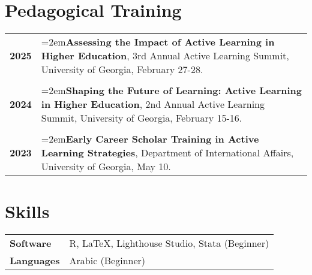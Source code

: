 \documentclass[letterpaper,12pt]{article}
\begin{document}
\section{Pedagogical Training}
\begin{xltabular}{\dimexpr\textwidth-0in}{p{.85in}X}
\textbf{2025} &  \hangindent=2em\textbf{Assessing the Impact of Active Learning in Higher Education}, 3rd Annual Active Learning Summit, University of Georgia, February 27-28.\\ \\
\textbf{2024} &  \hangindent=2em\textbf{Shaping the Future of Learning: Active Learning in Higher Education}, 2nd Annual Active Learning Summit, University of Georgia, February 15-16.\\ \\
\textbf{2023} &  \hangindent=2em\textbf{Early Career Scholar Training in Active Learning Strategies}, Department of \mbox{International} Affairs, University of Georgia, May 10.
\end{xltabular}

\section{Skills}
\begin{xltabular}{\dimexpr\textwidth-0in}{p{.85in}X}
\textbf{Software} &  R, \LaTeX, Lighthouse Studio, Stata (Beginner)\\
\textbf{Languages} & Arabic (Beginner)
\end{xltabular}

\end{document}
